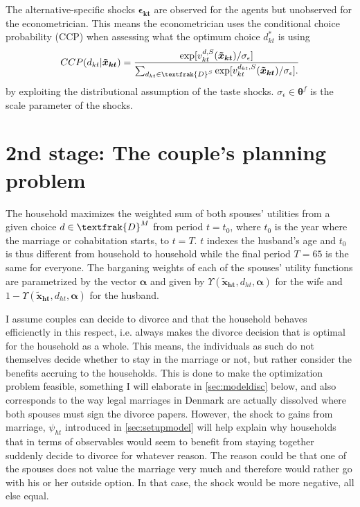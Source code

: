 The alternative-specific shocks $\boldsymbol{\epsilon_{kt}}$ are observed for the agents but unobserved for the econometrician. This means the econometrician uses the conditional choice probability (CCP) when assessing what the optimum choice $d_{kt}^*$ is using
\begin{align}
CCP(d_{kt}|\boldsymbol{\tilde{x}_{kt}})=\frac{\exp[v_{kt}^{d,S}(\boldsymbol{\tilde{x}_{kt}})/ \sigma_{\epsilon}]}{\sum_{d_{kt} \in \textfrak{D}^S} { \exp[v_{kt}^{d_{kt},S}(\boldsymbol{\tilde{x}_{kt}})/ \sigma_{\epsilon}].  }}
\label{eq:ccp_s}
\end{align}
by exploiting the distributional assumption of the taste shocks. $\sigma_{\epsilon}\in\boldsymbol{\theta}^f$ is the scale parameter of the shocks. 

\section{2nd stage: The couple's planning problem}
The household maximizes the weighted sum of both spouses' utilities from a given choice $d\in\textfrak{D}^M$ from period $t=t_0$, where $t_0$ is the year where the marriage or cohabitation starts, to $t=T$. $t$ indexes the husband's age and $t_0$ is thus different from household to household while the final period $T=65$ is the same for everyone. The barganing weights of each of the spouses' utility functions are parametrized by the vector $\boldsymbol{\alpha}$ and given by $\Upsilon(\boldsymbol{\tilde{x}_{ht}},d_{ht},\boldsymbol{\alpha})$ for the wife and $1-\Upsilon(\boldsymbol{\tilde{x}_{ht}},d_{ht},\boldsymbol{\alpha})$ for the husband. 

I assume couples can decide to divorce and that the household behaves efficienctly in this respect, i.e. always makes the divorce decision that is optimal for the household as a whole. This means, the individuals as such do not themselves decide whether to stay in the marriage or not, but rather consider the benefits accruing to the households. This is done to make the optimization problem feasible, something I will elaborate in \autoref{sec:modeldisc} below, and also corresponds to the way legal marriages in Denmark are actually dissolved where both spouses must sign the divorce papers. However, the shock to gains from marriage, $\psi_{ht}$ introduced in \autoref{sec:setupmodel} will help explain why households that in terms of observables would seem to benefit from staying together suddenly decide to divorce for whatever reason. The reason could be that one of the spouses does not value the marriage very much and therefore would rather go with his or her outside option. In that case, the shock would be more negative, all else equal.

